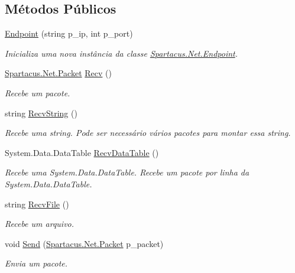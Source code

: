 \subsection*{Métodos Públicos}
\begin{DoxyCompactItemize}
\item 
\hyperlink{classSpartacus_1_1Net_1_1Endpoint_a8edbe7e16bf35d86dc1f8d23a0f968ab}{Endpoint} (string p\+\_\+ip, int p\+\_\+port)
\begin{DoxyCompactList}\small\item\em Inicializa uma nova instância da classe \hyperlink{classSpartacus_1_1Net_1_1Endpoint}{Spartacus.\+Net.\+Endpoint}. \end{DoxyCompactList}\item 
\hyperlink{classSpartacus_1_1Net_1_1Packet}{Spartacus.\+Net.\+Packet} \hyperlink{classSpartacus_1_1Net_1_1Endpoint_ac53736c6dd5f18b73409ff5a1df2bdb8}{Recv} ()
\begin{DoxyCompactList}\small\item\em Recebe um pacote. \end{DoxyCompactList}\item 
string \hyperlink{classSpartacus_1_1Net_1_1Endpoint_ab4b631ddbd930e4ee77e5840fd3ce14e}{Recv\+String} ()
\begin{DoxyCompactList}\small\item\em Recebe uma string. Pode ser necessário vários pacotes para montar essa string. \end{DoxyCompactList}\item 
System.\+Data.\+Data\+Table \hyperlink{classSpartacus_1_1Net_1_1Endpoint_a77b7337d19232f701d9309bb3b49d81b}{Recv\+Data\+Table} ()
\begin{DoxyCompactList}\small\item\em Recebe uma System.\+Data.\+Data\+Table. Recebe um pacote por linha da System.\+Data.\+Data\+Table. \end{DoxyCompactList}\item 
string \hyperlink{classSpartacus_1_1Net_1_1Endpoint_a6da241dad3b4cdfc193188b03089b8ed}{Recv\+File} ()
\begin{DoxyCompactList}\small\item\em Recebe um arquivo. \end{DoxyCompactList}\item 
void \hyperlink{classSpartacus_1_1Net_1_1Endpoint_a4f29f6186c156ad87017d6138e2e386d}{Send} (\hyperlink{classSpartacus_1_1Net_1_1Packet}{Spartacus.\+Net.\+Packet} p\+\_\+packet)
\begin{DoxyCompactList}\small\item\em Envia um pacote. \end{DoxyCompactList}\item 

\end{DoxyCompactItemize}
